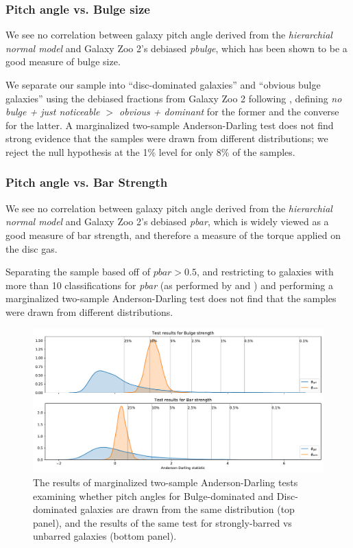 \subsubsection{Pitch angle vs. Bulge size}
We see no correlation between galaxy pitch angle derived from the \textit{hierarchial normal model} and Galaxy Zoo 2's debiased \citep{Willett2013:1308.3496v2} \textit{pbulge}, which has been shown to be a good measure of bulge size.

We separate our sample into ``disc-dominated galaxies'' and ``obvious bulge galaxies'' using the debiased fractions from Galaxy Zoo 2 following \citet{2017MNRAS.469.3363K}, defining \textit{no bulge + just noticeable $>$ obvious + dominant} for the former and the converse for the latter. A marginalized two-sample Anderson-Darling test \citep{doi:10.1080/01621459.1987.10478517} does not find strong evidence that the samples were drawn from different distributions; we reject the null hypothesis at the 1\% level for only 8\% of the samples.


\subsubsection{Pitch angle vs. Bar Strength}
We see no correlation between galaxy pitch angle derived from the \textit{hierarchial normal model} and Galaxy Zoo 2's debiased \textit{pbar}, which is widely viewed as a good measure of bar strength, and therefore a measure of the torque applied on the disc gas.

Separating the sample based off of $\mathrm{\textit{pbar}} > 0.5$, and restricting to galaxies with more than 10 classifications for \textit{pbar} (as performed by \citealt{2011MNRAS.411.2026M} and \citealt{2017MNRAS.469.3363K}) and performing a marginalized two-sample Anderson-Darling test does not find that the samples were drawn from different distributions.


\begin{figure}
  \includegraphics[width=17.7cm]{plots/bulge_bar_test_results.pdf}
  \caption{The results of marginalized two-sample Anderson-Darling tests examining whether pitch angles for Bulge-dominated and Disc-dominated galaxies are drawn from the same distribution (top panel), and the results of the same test for strongly-barred vs unbarred galaxies (bottom panel).}
  \label{fig:ad-morphology-test}
\end{figure}
